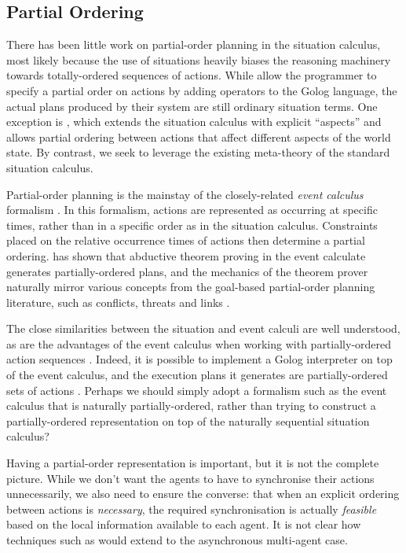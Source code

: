 \subsection{Partial Ordering}

There has been little work on partial-order planning in the situation
calculus, most likely because the use of situations heavily biases
the reasoning machinery towards totally-ordered sequences of actions.
While \citet{son00htn_golog} allow the programmer to specify a partial
order on actions by adding operators to the Golog language, the actual
plans produced by their system are still ordinary situation terms.
One exception is \citep{plaisted97sc_aspect}, which extends the situation
calculus with explicit {}``aspects'' and allows partial ordering
between actions that affect different aspects of the world state.
By contrast, we seek to leverage the existing meta-theory of the standard
situation calculus.

Partial-order planning is the mainstay of the closely-related \emph{event
calculus} formalism \citep{kowalski86event_calculus}. In this formalism,
actions are represented as occurring at specific times, rather than
in a specific order as in the situation calculus. Constraints placed
on the relative occurrence times of actions then determine a partial
ordering. \citet{Shanahan97ec_planning} has shown that abductive
theorem proving in the event calculate generates partially-ordered
plans, and the mechanics of the theorem prover naturally mirror various
concepts from the goal-based partial-order planning literature, such
as conflicts, threats and links \citep{peot92conditional_nonlinear}.

The close similarities between the situation and event calculi are
well understood, as are the advantages of the event calculus when
working with partially-ordered action sequences \citep{belleghem97sitcalc_evtcalc}.
Indeed, it is possible to implement a Golog interpreter on top of
the event calculus, and the execution plans it generates are partially-ordered
sets of actions \citep{pereira04ec_golog}. Perhaps we should simply
adopt a formalism such as the event calculus that is naturally partially-ordered,
rather than trying to construct a partially-ordered representation
on top of the naturally sequential situation calculus?

Having a partial-order representation is important, but it is not
the complete picture. While we don't want the agents to have to synchronise
their actions unnecessarily, we also need to ensure the converse:
that when an explicit ordering between actions is \emph{necessary},
the required synchronisation is actually \emph{feasible} based on
the local information available to each agent. It is not clear how
techniques such as \citep{pereira04ec_golog} would extend to the
asynchronous multi-agent case.

